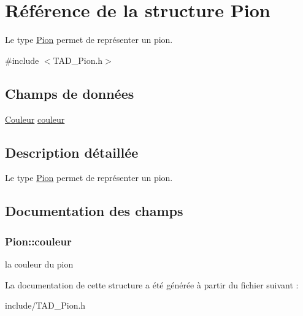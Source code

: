 \hypertarget{structPion}{}\section{Référence de la structure Pion}
\label{structPion}


Le type \hyperlink{structPion}{Pion} permet de représenter un pion.  




{\ttfamily \#include $<$T\+A\+D\+\_\+\+Pion.\+h$>$}

\subsection*{Champs de données}
\begin{DoxyCompactItemize}
\item 
\hyperlink{TAD__Couleur_8h_aa304d0ca681f782b1d7735da33037dd7}{Couleur} \hyperlink{structPion_a7e0f0e4140007d6bb17b9939cb494f0c}{couleur}
\end{DoxyCompactItemize}


\subsection{Description détaillée}
Le type \hyperlink{structPion}{Pion} permet de représenter un pion. 

\subsection{Documentation des champs}
\hypertarget{structPion_a7e0f0e4140007d6bb17b9939cb494f0c}{}
\subsubsection[{couleur}]{ Pion\+::couleur}\label{structPion_a7e0f0e4140007d6bb17b9939cb494f0c}
la couleur du pion 

La documentation de cette structure a été générée à partir du fichier suivant \+:\begin{DoxyCompactItemize}
\item 
include/T\+A\+D\+\_\+\+Pion.\+h\end{DoxyCompactItemize}

